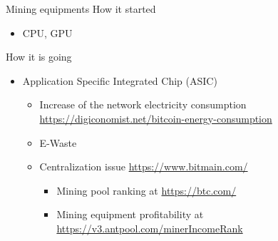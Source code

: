 \documentclass{beamer}
\begin{document}
\begin{frame}{Mining equipments}
How it started
\begin{itemize}
  \item CPU, GPU
\end{itemize}
How it is going
\begin{itemize}
  \item Application Specific Integrated Chip (ASIC)
  \begin{itemize}
  \item Increase of the network electricity consumption \url{https://digiconomist.net/bitcoin-energy-consumption}
  \item E-Waste
  \item Centralization issue \url{https://www.bitmain.com/}
  \begin{itemize}
    \item Mining pool ranking at \url{https://btc.com/}
    \item Mining equipment profitability at \url{https://v3.antpool.com/minerIncomeRank}
  \end{itemize}
  \end{itemize}
\end{itemize}
\end{frame}
\end{document}
